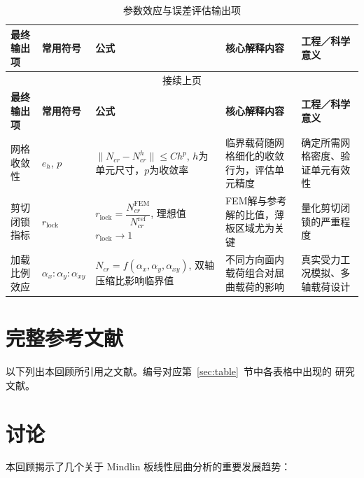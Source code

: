 \documentclass[12pt,a4paper]{article}
\begin{document}
\begin{landscape}
\begin{longtable}{p{2.4cm}p{2.4cm}p{5.5cm}p{4.5cm}p{4.5cm}}
\caption{参数效应与误差评估输出项} \label{tab:param_err} \\
\toprule
\textbf{最终输出项} & \textbf{常用符号} & \textbf{公式} & \textbf{核心解释内容} & \textbf{工程／科学意义} \\
\midrule
\endfirsthead
\multicolumn{5}{c}{接续上页} \\
\toprule
\textbf{最终输出项} & \textbf{常用符号} & \textbf{公式} & \textbf{核心解释内容} & \textbf{工程／科学意义} \\
\midrule
\endhead
\bottomrule
\endfoot
网格收敛性 & $e_h$, $p$ & $\|N_{cr}-N_{cr}^h\| \leq Ch^p$, $h$为单元尺寸，$p$为收敛率 & 临界载荷随网格细化的收敛行为，评估单元精度 & 确定所需网格密度、验证单元有效性 \\
\addlinespace
剪切闭锁指标 & $r_{\text{lock}}$ & $r_{\text{lock}}=\dfrac{N_{cr}^{\text{FEM}}}{N_{cr}^{\text{ref}}}$, 理想值$r_{\text{lock}}\to1$ & FEM解与参考解的比值，薄板区域尤为关键 & 量化剪切闭锁的严重程度 \\
\addlinespace
加载比例效应 & $\alpha_x:\alpha_y:\alpha_{xy}$ & $N_{cr}=f(\alpha_x,\alpha_y,\alpha_{xy})$, 双轴压缩比影响临界值 & 不同方向面内载荷组合对屈曲载荷的影响 & 真实受力工况模拟、多轴载荷设计 \\
\end{longtable}

\end{landscape}
\normalsize

\section{完整参考文献}
\label{sec:refs}

以下列出本回顾所引用之文献。编号对应第~\ref{sec:table}~节中各表格中出现的
研究文献。




\section{讨论}
\label{sec:discussion}

本回顾揭示了几个关于 Mindlin 板线性屈曲分析的重要发展趋势：
\end{document}

